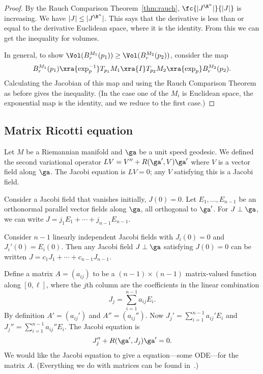 \begin{proof}
By the Rauch Comparison Theorem~\ref{thm:rauch}, $\fc{|J^{\R^n}|}{|J|}$ is increasing. We have $|J|\le |J^{\R^n}|$. This says that the  %
derivative is less than or equal to the derivative Euclidean space, where it is the identity. From this we can get the inequality for volumes.

In general, to show $\Vol(B_r^{M_1}(p_1))\ge \Vol(B_r^{M_2}(p_2))$, consider the map 
\[
B_r^{M_1}(p_1)\xra{\exp_p^{-1}} T_{p_1}M_1\xra{I} T_{p_2}M_2\xra{\exp_p} B_r^{M_2}(p_2).
\]
Calculating the Jacobian of this map and using the Rauch Comparison Theorem as before gives the inequality. (In the case one of the $M_i$ is Euclidean space, the exponential map is the identity, and we reduce to the first case.)
\end{proof}

\subsection{Matrix Ricotti equation}

Let $M$ be a Riemannian manifold and $\ga$ be a unit speed geodesic. We defined the second variational operator $LV=V''+R(\ga',V)\ga'$ where $V$ is a vector field along $\ga$. The Jacobi equation is $LV=0$; any $V$ satisfying this is a Jacobi field.

Consider a Jacobi field that vanishes initially, $J(0)=0$. %
Let $E_1,\ldots, E_{n-1}$ be an orthonormal parallel vector fields along $\ga$, all orthogonal to $\ga'$. For $J\perp \ga$, we can write $J=j_1E_1+\cdots + j_{n-1}E_{n-1}$. 

Consider $n-1$ linearly independent Jacobi fields with $J_i(0)=0$ and $J_i'(0)=E_i(0)$. Then any Jacobi field $J\perp \ga$ satisfying $J(0)=0$ can be written $J=c_1J_1+\cdots +c_{n-1}J_{n-1}$.

Define a matrix $A=(a_{ij})$ to be a $(n-1)\times (n-1)$ matrix-valued function along $[0,\ell]$, where the $j$th column are the coefficients in the linear combination
\[
J_j=\sum_{i=1}^{n-1} a_{ij}E_i.
\]
By definition $A'=(a_{ij}')$ and $A''=(a_{ij}'')$. Now $J_j'=\sum_{i=1}^{n-1} a_{ij}'E_i$ and $J_j''=\sum_{i=1}^{n-1} a_{ij}''E_i$. The Jacobi equation is
\[
J_j''+R(\ga',J_j)\ga'=0.
\]
We would like the Jacobi equation to give a equation---some ODE---for the matrix $A$. (Everything we do with matrices can be found in~\cite{AB}.)

